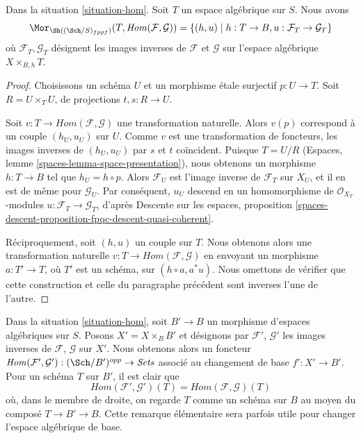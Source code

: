 \begin{lemma}
\label{lemma-extend-hom-to-spaces}
Dans la situation \ref{situation-hom}. Soit $T$ un espace algébrique sur $S$.
Nous avons
$$
\Mor_{\Sh((\Sch/S)_{fppf})}(T, \mathit{Hom}(\mathcal{F}, \mathcal{G})) =
\{(h, u) \mid h : T \to B, u : \mathcal{F}_T \to \mathcal{G}_T\}
$$
où $\mathcal{F}_T, \mathcal{G}_T$ désignent les images inverses de
$\mathcal{F}$ et $\mathcal{G}$ sur l'espace algébrique
$X \times_{B, h} T$.
\end{lemma}

\begin{proof}
Choisissons un schéma $U$ et un morphisme étale surjectif $p : U \to T$.
Soit $R = U \times_T U$, de projections $t, s : R \to U$.

\medskip\noindent
Soit $v : T \to \mathit{Hom}(\mathcal{F}, \mathcal{G})$ une transformation
naturelle. Alors $v(p)$ correspond à un couple $(h_U, u_U)$ sur $U$. Comme
$v$ est une transformation de foncteurs, les images inverses de
$(h_U, u_U)$ par $s$ et $t$ coïncident. Puisque $T = U/R$ (Espaces, lemme
\ref{spaces-lemma-space-presentation}), nous obtenons un morphisme
$h : T \to B$ tel que $h_U = h \circ p$. Alors $\mathcal{F}_U$ est l'image
inverse de $\mathcal{F}_T$ sur $X_U$, et il en est de même pour
$\mathcal{G}_U$. Par conséquent, $u_U$ descend en un homomorphisme de
$\mathcal{O}_{X_T}$-modules $u : \mathcal{F}_T \to \mathcal{G}_T$, d'après
Descente sur les espaces, proposition
\ref{spaces-descent-proposition-fpqc-descent-quasi-coherent}.

\medskip\noindent
Réciproquement, soit $(h, u)$ un couple sur $T$. Nous obtenons alors une
transformation naturelle $v : T \to \mathit{Hom}(\mathcal{F}, \mathcal{G})$
en envoyant un morphisme $a : T' \to T$, où $T'$ est un schéma, sur
$(h \circ a, a^*u)$. Nous omettons de vérifier que cette construction et celle
du paragraphe précédent sont inverses l'une de l'autre.
\end{proof}

\begin{remark}
\label{remark-hom-base-change}
Dans la situation \ref{situation-hom}, soit $B' \to B$ un morphisme d'espaces
algébriques sur $S$. Posons $X' = X \times_B B'$ et désignons par
$\mathcal{F}'$, $\mathcal{G}'$ les images inverses de $\mathcal{F}$,
$\mathcal{G}$ sur $X'$. Nous obtenons alors un foncteur
$\mathit{Hom}(\mathcal{F}', \mathcal{G}') : (\Sch/B')^{opp} \to \textit{Sets}$
associé au changement de base $f' : X' \to B'$. Pour un schéma $T$ sur $B'$,
il est clair que
$$
\mathit{Hom}(\mathcal{F}', \mathcal{G}')(T) =
\mathit{Hom}(\mathcal{F}, \mathcal{G})(T)
$$
où, dans le membre de droite, on regarde $T$ comme un schéma sur $B$ au moyen
du composé $T \to B' \to B$. Cette remarque élémentaire sera parfois utile
pour changer l'espace algébrique de base.
\end{remark}

